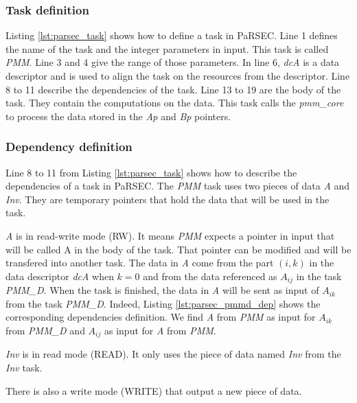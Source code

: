 \begin{figure}

\end{figure}


\subsubsection{Task definition}
Listing \ref{lst:parsec_task} shows how to define a task in PaRSEC.
Line 1 defines the name of the task and the integer parameters in input.
This task is called \textit{PMM}.
Line 3 and 4 give the range of those parameters.
In line 6, \textit{dcA} is a data descriptor and is used to align the task on the resources from the descriptor.
Line 8 to 11 describe the dependencies of the task.
Line 13 to 19 are the body of the task.
They contain the computations on the data.
This task calls the \textit{pmm\_core} to process the data stored in the \textit{Ap} and \textit{Bp} pointers.


\subsubsection{Dependency definition}
Line 8 to 11 from Listing \ref{lst:parsec_task} shows how to describe the dependencies of a task in PaRSEC.
The \textit{PMM} task uses two pieces of data \textit{A} and \textit{Inv}.
They are temporary pointers that hold the data that will be used in the task.

\textit{A} is in read-write mode (RW).
It means \textit{PMM} expects a pointer in input that will be called A in the body of the task.
That pointer can be modified and will be transfered into another task.
The data in \textit{A} come from the part $(i,k)$ in the data descriptor \textit{dcA} when $k=0$ and from the data referenced as \textit{$A_{ij}$} in the task \textit{PMM\_D}.
When the task is finished, the data in \textit{A} will be sent as input of \textit{$A_{ik}$} from the task \textit{PMM\_D}.
Indeed, Listing \ref{lst:parsec_pmmd_dep} shows the corresponding dependencies definition.
We find \textit{A} from \textit{PMM} as input for \textit{$A_{ik}$} from \textit{PMM\_D} and \textit{$A_{ij}$} as input for \textit{A} from \textit{PMM}.

\textit{Inv} is in read mode (READ).
It only uses the piece of data named \textit{Inv} from the \textit{Inv} task.

There is also a write mode (WRITE) that output a new piece of data.

